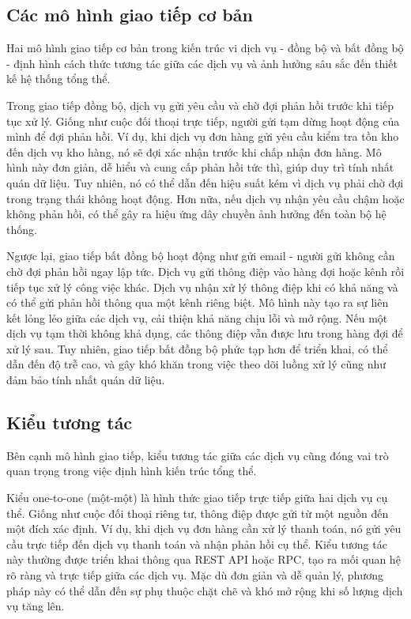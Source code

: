 \subsection{Các mô hình giao tiếp cơ bản}
Hai mô hình giao tiếp cơ bản trong kiến trúc vi dịch vụ - đồng bộ và bất đồng bộ - định hình cách thức tương tác giữa các dịch vụ và ảnh hưởng sâu sắc đến thiết kế hệ thống tổng thể.

Trong giao tiếp đồng bộ, dịch vụ gửi yêu cầu và chờ đợi phản hồi trước khi tiếp tục xử lý. Giống như cuộc đối thoại trực tiếp, người gửi tạm dừng hoạt động của mình để đợi phản hồi. Ví dụ, khi dịch vụ đơn hàng gửi yêu cầu kiểm tra tồn kho đến dịch vụ kho hàng, nó sẽ đợi xác nhận trước khi chấp nhận đơn hàng. Mô hình này đơn giản, dễ hiểu và cung cấp phản hồi tức thì, giúp duy trì tính nhất quán dữ liệu. Tuy nhiên, nó có thể dẫn đến hiệu suất kém vì dịch vụ phải chờ đợi trong trạng thái không hoạt động. Hơn nữa, nếu dịch vụ nhận yêu cầu chậm hoặc không phản hồi, có thể gây ra hiệu ứng dây chuyền ảnh hưởng đến toàn bộ hệ thống.

Ngược lại, giao tiếp bất đồng bộ hoạt động như gửi email - người gửi không cần chờ đợi phản hồi ngay lập tức. Dịch vụ gửi thông điệp vào hàng đợi hoặc kênh rồi tiếp tục xử lý công việc khác. Dịch vụ nhận xử lý thông điệp khi có khả năng và có thể gửi phản hồi thông qua một kênh riêng biệt. Mô hình này tạo ra sự liên kết lỏng lẻo giữa các dịch vụ, cải thiện khả năng chịu lỗi và mở rộng. Nếu một dịch vụ tạm thời không khả dụng, các thông điệp vẫn được lưu trong hàng đợi để xử lý sau. Tuy nhiên, giao tiếp bất đồng bộ phức tạp hơn để triển khai, có thể dẫn đến độ trễ cao, và gây khó khăn trong việc theo dõi luồng xử lý cũng như đảm bảo tính nhất quán dữ liệu.

\subsection{Kiểu tương tác}
Bên cạnh mô hình giao tiếp, kiểu tương tác giữa các dịch vụ cũng đóng vai trò quan trọng trong việc định hình kiến trúc tổng thể.

Kiểu one-to-one (một-một) là hình thức giao tiếp trực tiếp giữa hai dịch vụ cụ thể. Giống như cuộc đối thoại riêng tư, thông điệp được gửi từ một nguồn đến một đích xác định. Ví dụ, khi dịch vụ đơn hàng cần xử lý thanh toán, nó gửi yêu cầu trực tiếp đến dịch vụ thanh toán và nhận phản hồi cụ thể. Kiểu tương tác này thường được triển khai thông qua REST API hoặc RPC, tạo ra mối quan hệ rõ ràng và trực tiếp giữa các dịch vụ. Mặc dù đơn giản và dễ quản lý, phương pháp này có thể dẫn đến sự phụ thuộc chặt chẽ và khó mở rộng khi số lượng dịch vụ tăng lên.

